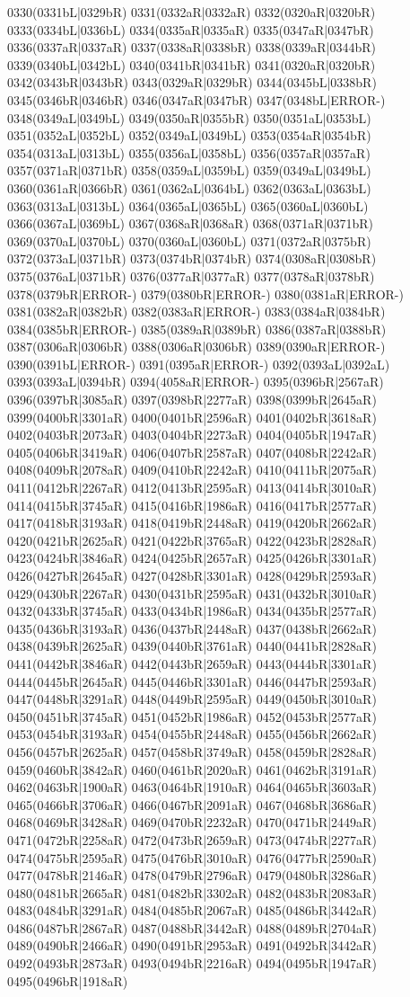 0330(0331bL|0329bR) 0331(0332aR|0332aR) 0332(0320aR|0320bR) 0333(0334bL|0336bL) 0334(0335aR|0335aR) 0335(0347aR|0347bR) 0336(0337aR|0337aR) 0337(0338aR|0338bR) 0338(0339aR|0344bR) 0339(0340bL|0342bL) 0340(0341bR|0341bR) 0341(0320aR|0320bR) 0342(0343bR|0343bR) 0343(0329aR|0329bR) 0344(0345bL|0338bR) 0345(0346bR|0346bR) 0346(0347aR|0347bR) 0347(0348bL|ERROR-) 0348(0349aL|0349bL) 0349(0350aR|0355bR) 0350(0351aL|0353bL) 0351(0352aL|0352bL) 0352(0349aL|0349bL) 0353(0354aR|0354bR) 0354(0313aL|0313bL) 0355(0356aL|0358bL) 0356(0357aR|0357aR) 0357(0371aR|0371bR) 0358(0359aL|0359bL) 0359(0349aL|0349bL) 0360(0361aR|0366bR) 0361(0362aL|0364bL) 0362(0363aL|0363bL) 0363(0313aL|0313bL) 0364(0365aL|0365bL) 0365(0360aL|0360bL) 0366(0367aL|0369bL) 0367(0368aR|0368aR) 0368(0371aR|0371bR) 0369(0370aL|0370bL) 0370(0360aL|0360bL) 0371(0372aR|0375bR) 0372(0373aL|0371bR) 0373(0374bR|0374bR) 0374(0308aR|0308bR) 0375(0376aL|0371bR) 0376(0377aR|0377aR) 0377(0378aR|0378bR) 0378(0379bR|ERROR-) 0379(0380bR|ERROR-) 0380(0381aR|ERROR-) 0381(0382aR|0382bR) 0382(0383aR|ERROR-) 0383(0384aR|0384bR) 0384(0385bR|ERROR-) 0385(0389aR|0389bR) 0386(0387aR|0388bR) 0387(0306aR|0306bR) 0388(0306aR|0306bR) 0389(0390aR|ERROR-) 0390(0391bL|ERROR-) 0391(0395aR|ERROR-) 0392(0393aL|0392aL) 0393(0393aL|0394bR) 0394(4058aR|ERROR-) 0395(0396bR|2567aR) 0396(0397bR|3085aR) 0397(0398bR|2277aR) 0398(0399bR|2645aR) 0399(0400bR|3301aR) 0400(0401bR|2596aR) 0401(0402bR|3618aR) 0402(0403bR|2073aR) 0403(0404bR|2273aR) 0404(0405bR|1947aR) 0405(0406bR|3419aR) 0406(0407bR|2587aR) 0407(0408bR|2242aR) 0408(0409bR|2078aR) 0409(0410bR|2242aR) 0410(0411bR|2075aR) 0411(0412bR|2267aR) 0412(0413bR|2595aR) 0413(0414bR|3010aR) 0414(0415bR|3745aR) 0415(0416bR|1986aR) 0416(0417bR|2577aR) 0417(0418bR|3193aR) 0418(0419bR|2448aR) 0419(0420bR|2662aR) 0420(0421bR|2625aR) 0421(0422bR|3765aR) 0422(0423bR|2828aR) 0423(0424bR|3846aR) 0424(0425bR|2657aR) 0425(0426bR|3301aR) 0426(0427bR|2645aR) 0427(0428bR|3301aR) 0428(0429bR|2593aR) 0429(0430bR|2267aR) 0430(0431bR|2595aR) 0431(0432bR|3010aR) 0432(0433bR|3745aR) 0433(0434bR|1986aR) 0434(0435bR|2577aR) 0435(0436bR|3193aR) 0436(0437bR|2448aR) 0437(0438bR|2662aR) 0438(0439bR|2625aR) 0439(0440bR|3761aR) 0440(0441bR|2828aR) 0441(0442bR|3846aR) 0442(0443bR|2659aR) 0443(0444bR|3301aR) 0444(0445bR|2645aR) 0445(0446bR|3301aR) 0446(0447bR|2593aR) 0447(0448bR|3291aR) 0448(0449bR|2595aR) 0449(0450bR|3010aR) 0450(0451bR|3745aR) 0451(0452bR|1986aR) 0452(0453bR|2577aR) 0453(0454bR|3193aR) 0454(0455bR|2448aR) 0455(0456bR|2662aR) 0456(0457bR|2625aR) 0457(0458bR|3749aR) 0458(0459bR|2828aR) 0459(0460bR|3842aR) 0460(0461bR|2020aR) 0461(0462bR|3191aR) 0462(0463bR|1900aR) 0463(0464bR|1910aR) 0464(0465bR|3603aR) 0465(0466bR|3706aR) 0466(0467bR|2091aR) 0467(0468bR|3686aR) 0468(0469bR|3428aR) 0469(0470bR|2232aR) 0470(0471bR|2449aR) 0471(0472bR|2258aR) 0472(0473bR|2659aR) 0473(0474bR|2277aR) 0474(0475bR|2595aR) 0475(0476bR|3010aR) 0476(0477bR|2590aR) 0477(0478bR|2146aR) 0478(0479bR|2796aR) 0479(0480bR|3286aR) 0480(0481bR|2665aR) 0481(0482bR|3302aR) 0482(0483bR|2083aR) 0483(0484bR|3291aR) 0484(0485bR|2067aR) 0485(0486bR|3442aR) 0486(0487bR|2867aR) 0487(0488bR|3442aR) 0488(0489bR|2704aR) 0489(0490bR|2466aR) 0490(0491bR|2953aR) 0491(0492bR|3442aR) 0492(0493bR|2873aR) 0493(0494bR|2216aR) 0494(0495bR|1947aR) 0495(0496bR|1918aR) 